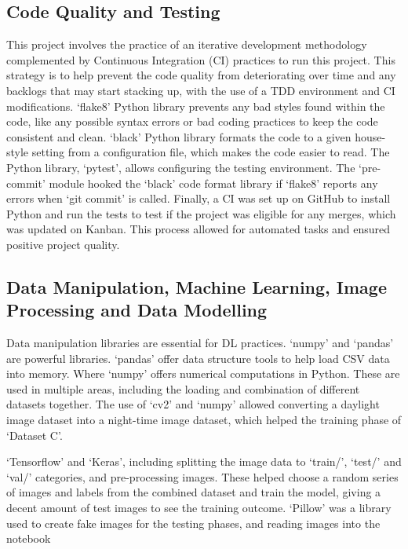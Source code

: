\documentclass[12pt]{report} %
\begin{document}
		\subsection*{Code Quality and Testing}
			This project involves the practice of an iterative development methodology complemented by Continuous Integration (CI) practices to run this project. This strategy is to help prevent the code quality from deteriorating over time and any backlogs that may start stacking up, with the use of a TDD environment and CI modifications. `flake8' Python library prevents any bad styles found within the code, like any possible syntax errors or bad coding practices to keep the code consistent and clean. `black' Python library formats the code to a given house-style setting from a configuration file, which makes the code easier to read. The Python library, `pytest', allows configuring the testing environment. The `pre-commit' module hooked the `black' code format library if `flake8' reports any errors when `git commit' is called. Finally, a CI was set up on GitHub to install Python and run the tests to test if the project was eligible for any merges, which was updated on Kanban. This process allowed for automated tasks and ensured positive project quality.
		

		\subsection*{Data Manipulation, Machine Learning, Image Processing and Data Modelling}
			Data manipulation libraries are essential for DL practices. `numpy' and `pandas' are powerful libraries. `pandas' offer data structure tools to help load CSV data into memory. Where `numpy' offers numerical computations in Python. These are used in multiple areas, including the loading and combination of different datasets together. The use of `cv2' and `numpy' allowed converting a daylight image dataset into a night-time image dataset, which helped the training phase of `Dataset C'.

			`Tensorflow' and `Keras', including splitting the image data to `train/', `test/' and `val/' categories, and pre-processing images. These helped choose a random series of images and labels from the combined dataset and train the model, giving a decent amount of test images to see the training outcome. `Pillow' was a library used to create fake images for the testing phases, and reading images into the notebook
		
\end{document}

